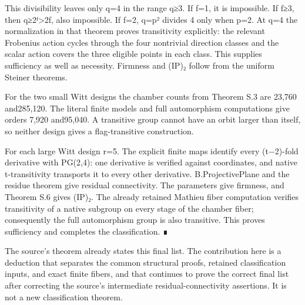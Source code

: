This divisibility leaves only q=4 in the range q≥3. If f=1, it is
impossible. If f≥3, then q≥2ᶠ\textgreater2f, also impossible. If f=2,
q=p² divides 4 only when p=2. At q=4 the normalization in that theorem
proves transitivity explicitly: the relevant Frobenius action cycles
through the four nontrivial direction classes and the scalar action
covers the three eligible points in each class. This supplies
sufficiency as well as necessity. Firmness and (IP)₂ follow from the
uniform Steiner theorems.

For the two small Witt designs the chamber counts from Theorem S.3
are 23,760 and285,120. The literal finite models and full automorphism
computations give orders 7,920 and95,040. A transitive group cannot have
an orbit larger than itself, so neither design gives a flag-transitive
construction.

For each large Witt design r=5. The explicit finite maps identify every
(t−2)-fold derivative with PG(2,4): one derivative is verified against
coordinates, and native t-transitivity transports it to every other
derivative. B.ProjectivePlane and the residue theorem give residual
connectivity. The parameters give firmness, and Theorem S.6 gives (IP)₂.
The already retained Mathieu fiber computation verifies transitivity of
a native subgroup on every stage of the chamber fiber; consequently the
full automorphism group is also transitive. This proves sufficiency and
completes the classification. ∎

The source's theorem already states this final list. The contribution
here is a deduction that separates the common structural proofs,
retained classification inputs, and exact finite fibers, and that
continues to prove the correct final list after correcting the source's
intermediate residual-connectivity assertions. It is not a new
classification theorem.
